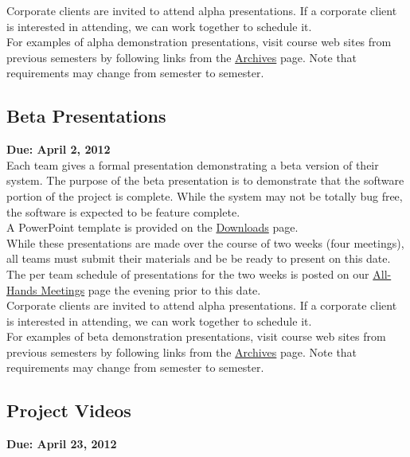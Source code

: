 \documentclass[11pt,a4paper,oneside]{article}
\begin{document}
Corporate clients are invited to attend alpha presentations. If a corporate client is interested in attending, we can work together to schedule it.\\

For examples of alpha demonstration presentations, visit course web sites from previous semesters by following links from the \href{http://www.cse.msu.edu/~cse498/2012-01/archives}{Archives} page. Note that requirements may change from semester to semester.\\

\subsection{Beta Presentations}
\textbf{Due: April 2, 2012}\\

Each team gives a formal presentation demonstrating a beta version of their system. The purpose of the beta presentation is to demonstrate that the software portion of the project is complete. While the system may not be totally bug free, the software is expected to be feature complete.\\

A PowerPoint template is provided on the \href {http://www.cse.msu.edu/~cse498/2012-01/other-links/downloads}{Downloads} page.\\

While these presentations are made over the course of two weeks (four meetings), all teams must submit their materials and be be ready to present on this date. The per team schedule of presentations for the two weeks is posted on our \href{http://www.cse.msu.edu/~cse498/2012-01/schedules/all-hands-meetings}{All-Hands Meetings} page the evening prior to this date.\\

Corporate clients are invited to attend alpha presentations. If a corporate client is interested in attending, we can work together to schedule it.\\

For examples of beta demonstration presentations, visit course web sites from previous semesters by following links from the \href{http://www.cse.msu.edu/~cse498/2012-01/archives}{Archives} page. Note that requirements may change from semester to semester.\\


\subsection{Project Videos}
\textbf{Due: April 23, 2012}\\
\end{document}

